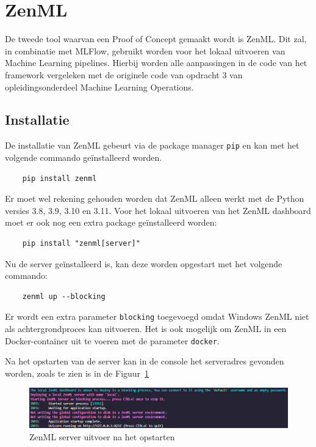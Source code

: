 \section{ZenML}
De tweede tool waarvan een Proof of Concept gemaakt wordt is ZenML. Dit zal, in combinatie met MLFlow, gebruikt worden voor het lokaal uitvoeren van Machine Learning pipelines. Hierbij worden alle aanpassingen in de code van het framework vergeleken met de originele code van opdracht 3 van opleidingsonderdeel Machine Learning Operations.

\subsection{Installatie}
De installatie van ZenML gebeurt via de package manager \texttt{pip} en kan met het volgende commando geïnstalleerd worden.
\begin{verbatim}
    pip install zenml
\end{verbatim}
Er moet wel rekening gehouden worden dat ZenML alleen werkt met de Python versies 3.8, 3.9, 3.10 en 3.11.
Voor het lokaal uitvoeren van het ZenML dashboard moet er ook nog een extra package geïnstalleerd worden:
\begin{verbatim}
    pip install "zenml[server]"
\end{verbatim}

Nu de server geïnstalleerd is, kan deze worden opgestart met het volgende commando: 
\begin{verbatim}
    zenml up --blocking
\end{verbatim}
Er wordt een extra parameter \texttt{blocking} toegevoegd omdat Windows ZenML niet als achtergrondproces kan uitvoeren. Het is ook mogelijk om ZenML in een Docker-container uit te voeren met de parameter \texttt{docker}.

Na het opstarten van de server kan in de console het serveradres gevonden worden, zoals te zien is in de Figuur~\ref{fig:ZenMLServer}
\begin{figure}[h]
    \centering
    \includegraphics[width=0.9\linewidth]{graphics/ZenML_Server.PNG}
    \caption{ZenML server uitvoer na het opstarten}
    \label{fig:ZenMLServer}
\end{figure}
